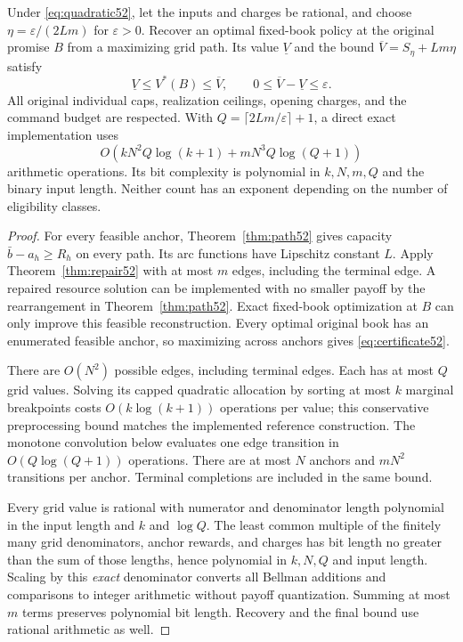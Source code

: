 \begin{theorem}\label{thm:approx52}
Under \eqref{eq:quadratic52}, let the inputs and charges be rational, and choose $\eta=\varepsilon/(2Lm)$ for $\varepsilon>0$. Recover an optimal fixed-book policy at the original promise $B$ from a maximizing grid path. Its value $\underline V$ and the bound $\overline V=S_\eta+Lm\eta$ satisfy
\begin{equation}\label{eq:certificate52}
 \underline V\leq V^*(B)\leq\overline V,\qquad 0\leq\overline V-\underline V\leq\varepsilon.
\end{equation}
All original individual caps, realization ceilings, opening charges, and the command budget are respected. With $Q=\lceil2Lm/\varepsilon\rceil+1$, a direct exact implementation uses
\begin{equation}\label{eq:complexity52}
 O\!\left(kN^2Q\log(k+1)+mN^3Q\log(Q+1)\right)
\end{equation}
arithmetic operations. Its bit complexity is polynomial in $k,N,m,Q$ and the binary input length. Neither count has an exponent depending on the number of eligibility classes.
\end{theorem}
\begin{proof}
For every feasible anchor, Theorem~\ref{thm:path52} gives capacity $\bar b-a_h\geq R_h$ on every path. Its arc functions have Lipschitz constant $L$. Apply Theorem~\ref{thm:repair52} with at most $m$ edges, including the terminal edge. A repaired resource solution can be implemented with no smaller payoff by the rearrangement in Theorem~\ref{thm:path52}. Exact fixed-book optimization at $B$ can only improve this feasible reconstruction. Every optimal original book has an enumerated feasible anchor, so maximizing across anchors gives \eqref{eq:certificate52}.

There are $O(N^2)$ possible edges, including terminal edges. Each has at most $Q$ grid values. Solving its capped quadratic allocation by sorting at most $k$ marginal breakpoints costs $O(k\log(k+1))$ operations per value; this conservative preprocessing bound matches the implemented reference construction. The monotone convolution below evaluates one edge transition in $O(Q\log(Q+1))$ operations. There are at most $N$ anchors and $mN^2$ transitions per anchor. Terminal completions are included in the same bound.

Every grid value is rational with numerator and denominator length polynomial in the input length and $k$ and $\log Q$. The least common multiple of the finitely many grid denominators, anchor rewards, and charges has bit length no greater than the sum of those lengths, hence polynomial in $k,N,Q$ and input length. Scaling by this \emph{exact} denominator converts all Bellman additions and comparisons to integer arithmetic without payoff quantization. Summing at most $m$ terms preserves polynomial bit length. Recovery and the final bound use rational arithmetic as well.
\end{proof}

